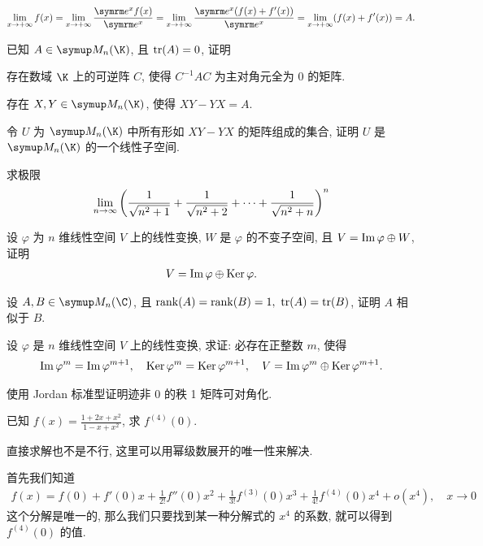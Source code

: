\begin{exercise}[series=exer]
\begin{answer}
\begin{align*}
          \limit{x}{+\infty} f(x) = \limit{x}{+\infty} \frac{\me^{x} f(x)}{\me^{x}} = \limit{x}{+\infty} \frac{\me^{x}(f(x) + f'(x))}{\me^{x}} = \limit{x}{+\infty} (f(x) + f'(x)) = A.
      \end{align*}
  \end{answer}
  \item 已知 $ A \in \MM[\K] $, 且 $ \tr(A) = 0 $, 证明
  \begin{exercise}
      \item 存在数域 $ \K $ 上的可逆阵 $ C $, 使得 $ C^{-1}AC $ 为主对角元全为 $ 0 $ 的矩阵.
      \item 存在 $ X, Y \in \MM[\K] $, 使得 $ XY - YX = A $.
      \item 令 $ U $ 为 $ \MM[\K] $ 中所有形如 $ XY - YX $ 的矩阵组成的集合, 证明 $ U $ 是 $ \MM[\K] $ 的一个线性子空间.
  \end{exercise}
  \item 求极限
  \begin{align*}
      \lim_{n \to \infty} \qty(\frac{1}{\sqrt{n^{2} + 1}} + \frac{1}{\sqrt{n^{2} + 2}} + \dots + \frac{1}{\sqrt{n^{2} + n}})^{n}
  \end{align*}
  \item 设 $ \varphi $ 为 $ n $ 维线性空间 $ V $ 上的线性变换, $ W $ 是 $ \varphi $ 的不变子空间, 且 $ V = \operatorname{Im} \varphi \oplus W $, 证明
  \begin{align*}
      V = \operatorname{Im} \varphi \oplus \operatorname{Ker} \varphi.
  \end{align*}
  \item 设 $ A, B \in \MM[\C] $, 且 $ \rank(A) = \rank(B)  = 1,\ \tr(A) = \tr(B) $, 证明 $ A $ 相似于 $ B $.
  \item 设 $ \varphi $ 是 $ n $ 维线性空间 $ V $ 上的线性变换, 求证: 必存在正整数 $ m $, 使得
  \begin{align*}
      \operatorname{Im} \varphi^{m} = \operatorname{Im} \varphi^{m+1},\quad \operatorname{Ker} \varphi^{m} = \operatorname{Ker} \varphi^{m+1}, \quad V = \operatorname{Im} \varphi^{m} \oplus \operatorname{Ker} \varphi^{m+1}.
  \end{align*}
  \item 使用 Jordan 标准型证明迹非 $ 0 $ 的秩 1 矩阵可对角化.
  \item 已知 $ f(x) = \frac{1 + 2x + x^{2}}{1 - x + x^{2}} $, 求 $ f^{(4)}(0) $.
  \begin{hint}
      直接求解也不是不行, 这里可以用幂级数展开的唯一性来解决.
  \end{hint}
  \begin{answer}
      首先我们知道
      \begin{align*}
          f(x) = f(0) + f'(0)x + \frac{1}{2!}f''(0)x^{2} + \frac{1}{3!}f^{(3)}(0)x^{3} + \frac{1}{4!}f^{(4)}(0)x^{4} + o(x^{4}),\quad x \to 0
      \end{align*}
      这个分解是唯一的, 那么我们只要找到某一种分解式的 $ x^{4} $ 的系数, 就可以得到 $ f^{(4)}(0) $ 的值.


\end{answer}
\end{exercise}
